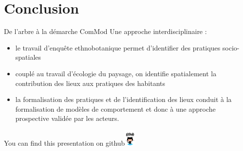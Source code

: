 \documentclass[newPxFont]{beamer}
\begin{document}
\section{Conclusion}
\begin{frame}[c]{De l'arbre à la démarche ComMod}
\vspace{-1cm}
Une approche interdisciplinaire :
\begin{itemize}
  \item le travail d'enquête ethnobotanique permet d'identifier des pratiques socio-spatiales
  \item couplé au travail d'écologie du paysage, on identifie spatialement la contribution des lieux aux pratiques des habitants
  \item la formalisation des pratiques et de l'identification des lieux conduit à la formalisation de modèles de comportement et donc à une approche prospective validée par les acteurs.
\end{itemize}
\end{frame}


{
%
\begin{frame}
  \vspace{-1em}
  \begin{minipage}[t][.8\textheight]{\textwidth}

    \vfill

  \end{minipage}
  \vspace{-3.5em}
  \centering
	You can find this presentation on github\includegraphics[height=0.85cm]{img/github}

\end{frame}
}
\end{document}
